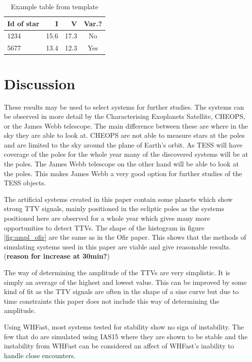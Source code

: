 \documentclass[12pt]{report}
\begin{document}
\begin{table}[!h]
\caption{Example table from template}\smallskip
\label{table:1}
\centering  
\begin{tabular}{lrrc}
\hline\hline  
\smallskip
Id of star & I &  V & Var.? \\
\hline
1234 & 15.6 & 17.3 & No \\
5677 & 13.4 & 12.3 & Yes\\
\hline
\end{tabular}
\end{table}
\fi

\chapter{Discussion}
	These results may be used to select systems for further studies. The systems can be observed in more detail by the Characterising Exoplanets Satellite, CHEOPS, or the James Webb telescope. The main difference between these are where in the sky they are able to look at. CHEOPS are not able to measure stars at the poles and are limited to the sky around the plane of Earth's orbit. As TESS will have coverage of the poles for the whole year many of the discovered systems will be at the poles. The James Webb telescope on the other hand will be able to look at the poles. This makes James Webb a very good option for further studies of the TESS objects. 
	
	The artificial systems created in this paper contain some planets which show strong TTV signals, mainly positioned in the ecliptic poles as the systems positioned here are observed for a whole year which gives many more opportunities to detect TTVs. The shape of the histogram in figure \ref{fig:ampl_ofir} are the same as in the Ofir paper. This shows that the methods of simulating systems used in this paper are viable and give reasonable results. (\textbf{reason for increase at 30min?})
	
	The way of determining the amplitude of the TTVs are very simplistic. It is simply an average of the highest and lowest value. This can be improved by some kind of fit as the TTV signals are often in the shape of a sine curve but due to time constraints this paper does not include this way of determining the amplitude.
	
	Using WHFast, most systems tested for stability show no sign of instability. The few that do are simulated using IAS15 where they are shown to be stable and the instability from WHFast can be considered an affect of WHFast's inability to handle close encounters.
	
\end{document}
